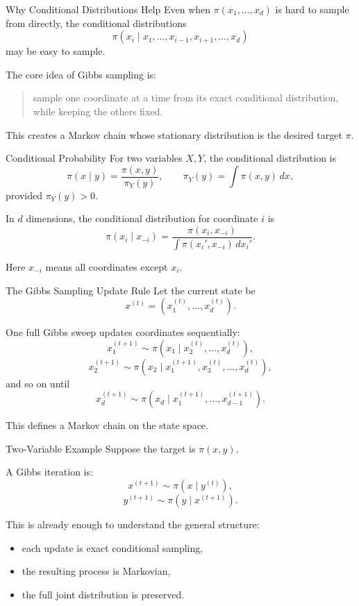 \documentclass[aspectratio=169]{beamer}
\begin{document}
\begin{frame}{Why Conditional Distributions Help}
Even when \(\pi(x_1,\dots,x_d)\) is hard to sample from directly, the conditional distributions
\[
\pi(x_i \mid x_1,\dots,x_{i-1},x_{i+1},\dots,x_d)
\]
may be easy to sample.

\medskip

The core idea of Gibbs sampling is:
\begin{quote}
sample one coordinate at a time from its exact conditional distribution, while keeping the others fixed.
\end{quote}

This creates a Markov chain whose stationary distribution is the desired target \(\pi\).
\end{frame}

\begin{frame}{Conditional Probability}
For two variables \(X,Y\), the conditional distribution is
\[
\pi(x\mid y)=\frac{\pi(x,y)}{\pi_Y(y)},
\qquad
\pi_Y(y)=\int \pi(x,y)\,dx,
\]
provided \(\pi_Y(y)>0\).

In \(d\) dimensions, the conditional distribution for coordinate \(i\) is
\[
\pi(x_i \mid x_{-i})
=
\frac{\pi(x_i,x_{-i})}{\int \pi(x_i',x_{-i})\,dx_i'}.
\]

Here \(x_{-i}\) means all coordinates except \(x_i\).
\end{frame}

\begin{frame}{The Gibbs Sampling Update Rule}
Let the current state be
\[
x^{(t)}=(x_1^{(t)},\dots,x_d^{(t)}).
\]

One full Gibbs sweep updates coordinates sequentially:
\[
x_1^{(t+1)} \sim \pi(x_1 \mid x_2^{(t)},\dots,x_d^{(t)}),
\]
\[
x_2^{(t+1)} \sim \pi(x_2 \mid x_1^{(t+1)},x_3^{(t)},\dots,x_d^{(t)}),
\]
and so on until
\[
x_d^{(t+1)} \sim \pi(x_d \mid x_1^{(t+1)},\dots,x_{d-1}^{(t+1)}).
\]

This defines a Markov chain on the state space.
\end{frame}

\begin{frame}{Two-Variable Example}
Suppose the target is \(\pi(x,y)\).

A Gibbs iteration is:
\[
x^{(t+1)} \sim \pi(x \mid y^{(t)}),
\]
\[
y^{(t+1)} \sim \pi(y \mid x^{(t+1)}).
\]

This is already enough to understand the general structure:
\begin{itemize}
    \item each update is exact conditional sampling,
    \item the resulting process is Markovian,
    \item the full joint distribution is preserved.
\end{itemize}
\end{frame}
\end{document}
